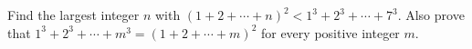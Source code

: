 Find the largest integer $n$ with $(1+2+\cdots+n)^2<1^3+2^3+\cdots+7^3$. Also prove that $1^3+2^3+\cdots+m^3=(1+2+\cdots+m)^2$ for every positive integer $m$.
